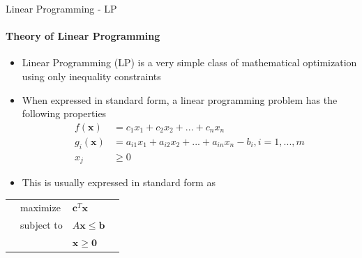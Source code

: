 \documentclass{beamer}
\renewcommand{\vec}{\mathbf}
\begin{document}
	\begin{frame}{Linear Programming - LP}
		\framesubtitle{Theory of Linear Programming}
		\begin{itemize}
			\item Linear Programming (LP) is a very simple class of mathematical optimization using only inequality constraints
			\item When expressed in standard form, a linear programming problem has the following properties
			\begin{align*}
				f(\vec{x}) &= c_1x_1 + c_2x_2 + ... + c_nx_n\\
				g_i(\vec{x}) &= a_{i1}x_1 + a_{i2}x_2 + ... + a_{in}x_n - b_i, i=1,...,m\\
				x_j &\geq 0
			\end{align*}
			\item This is usually expressed in standard form as 
		\end{itemize}
		\begin{tabularx}{\textwidth}{X l l X}
			& maximize		& $\vec{c}^T\vec{x}$		& \\
			& subject to	& $A\vec{x} \leq \vec{b}$	& \\
			& 				& $\vec{x} \geq \vec{0}$	& 
		\end{tabularx}
	\end{frame}
%
\end{document}
